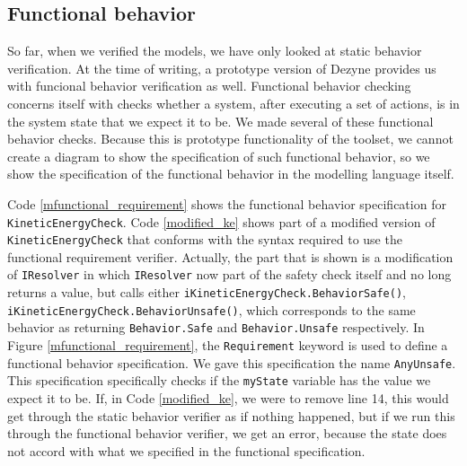\documentclass[12pt]{scrreprt}
\begin{document}
\subsection{Functional behavior}
So far, when we verified the models, we have only looked at static behavior verification. At the time of writing, a prototype version of Dezyne provides us with funcional behavior verification as well. Functional behavior checking concerns itself with checks whether a system, after executing a set of actions, is in the system state that we expect it to be. We made several of these functional behavior checks. Because this is prototype functionality of the toolset, we cannot create a diagram to show the specification of such functional behavior, so we show the specification of the functional behavior in the modelling language itself.
\par
Code \ref{mfunctional_requirement} shows the functional behavior specification for \texttt{KineticEnergyCheck}. Code \ref{modified_ke} shows part of a modified version of \texttt{KineticEnergyCheck} that conforms with the syntax required to use the functional requirement verifier. Actually, the part that is shown is a modification of \texttt{IResolver} in which \texttt{IResolver} now part of the safety check itself and no long returns a value, but calls either \texttt{iKineticEnergyCheck.BehaviorSafe()}, \texttt{iKineticEnergyCheck.BehaviorUnsafe()}, which corresponds to the same behavior as returning \texttt{Behavior.Safe} and \texttt{Behavior.Unsafe} respectively. In Figure \ref{mfunctional_requirement}, the \texttt{Requirement} keyword is used to define a functional behavior specification. We gave this specification the name \texttt{AnyUnsafe}. This specification specifically checks if the \texttt{myState} variable has the value we expect it to be. If, in Code \ref{modified_ke}, we were to remove line 14, this would get through the static behavior verifier as if nothing happened, but if we run this through the functional behavior verifier, we get an error, because the state does not accord with what we specified in the functional specification.
\end{document}
